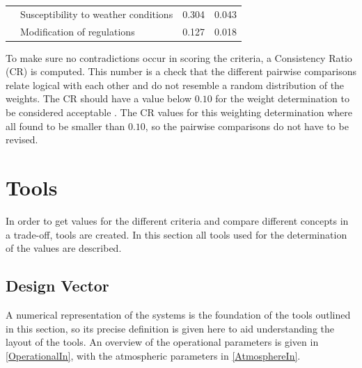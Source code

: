 \begin{table}[H]
{\begin{tabular}{|l|l|c|c|}
                                                                                          & Susceptibility to weather conditions & 0.304                 & 0.043                 \\ \cline{2-4} 
                                                                                          & Modification of regulations          & 0.127                 & 0.018                 \\ \hline
\end{tabular}%
}
\end{table}

To make sure no contradictions occur in scoring the criteria, a Consistency Ratio (CR) is computed. This number is a check that the different pairwise comparisons relate logical with each other and do not resemble a random distribution of the weights. The CR should have a value below $0.10$ for the weight determination to be considered acceptable \cite{AHPtut}. The CR values for this weighting determination where all found to be smaller than $0.10$, so the pairwise comparisons do not have to be revised.

\section{Tools}
\label{sec:Tools}

In order to get values for the different criteria and compare different concepts in a trade-off, tools are created. In this section all tools used for the determination of the values are described.

\subsection{Design Vector}
\label{subsec:desvector}
A numerical representation of the systems is the foundation of the tools outlined in this section, so its precise definition is given here to aid understanding the layout of the tools. An overview of the operational parameters is given in \autoref{OperationalIn}, with the atmospheric parameters in \autoref{AtmosphereIn}.


